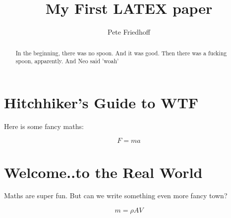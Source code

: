 \documentclass[]{article}
\title{My First LATEX paper}
\author{Pete Friedhoff}
\begin{document}
\maketitle

\begin{abstract}
	In the beginning, there was no spoon. And it was good. Then there was a fucking spoon, apparently. And Neo said 'woah' 

\end{abstract}

\section{Hitchhiker's Guide to WTF}
Here is some fancy maths:

\begin{equation}
F = ma
\end{equation}

\section{Welcome..to the Real World}
Maths are super fun. But can we write something even more fancy town?

\begin{equation}
m = \rho A V
\end{equation}
\end{document}
